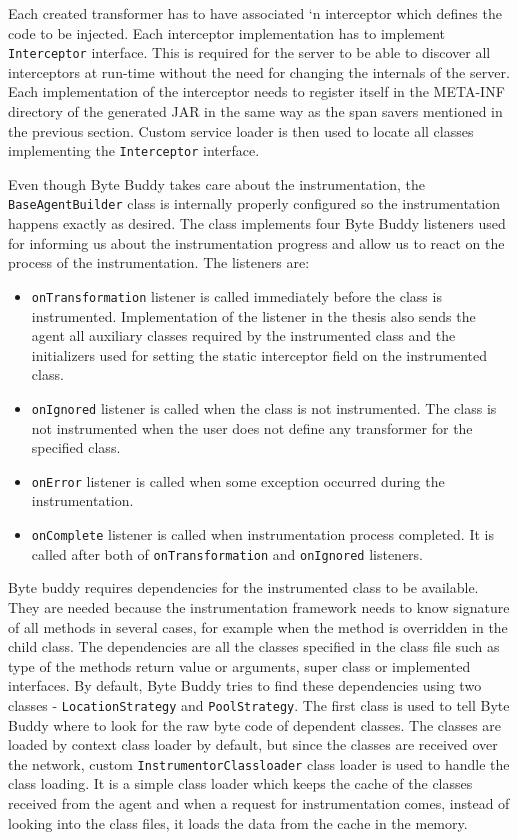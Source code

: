 Each created transformer has to have associated `n interceptor which defines the code to be injected. Each interceptor implementation has to implement \texttt{Interceptor}  interface. This is required for the server to be able to discover all interceptors at run-time without the need for changing the internals of the server. Each implementation of the interceptor needs to register itself in the META-INF directory of the generated JAR in the same way as the span savers mentioned in the previous section. Custom service loader is then used to locate all classes implementing the \texttt{Interceptor} interface.

Even though Byte Buddy takes care about the instrumentation, the \texttt{BaseAgentBuilder} class is internally properly configured so the instrumentation happens exactly as desired. The class implements four Byte Buddy listeners used for informing us about the instrumentation progress and allow us to react on the process of the instrumentation. The listeners are:
\begin{itemize}
	\item \texttt{onTransformation} listener is called immediately before the class is instrumented.  Implementation of the listener in the thesis also sends the agent all auxiliary classes required by the instrumented class and the initializers used for setting the static interceptor field on the instrumented class.
	\item \texttt{onIgnored} listener is called when the class is not instrumented. The class is not instrumented when the user does not define any transformer for the specified class.
	\item \texttt{onError} listener is called when some exception occurred during the instrumentation.
	\item \texttt{onComplete} listener is called when instrumentation process completed. It is called after both of \texttt{onTransformation} and \texttt{onIgnored} listeners.
\end{itemize}

Byte buddy requires dependencies for the instrumented class to be available. They are needed because the instrumentation framework needs to know signature of all methods in several cases, for example when the method is overridden in the child class. The dependencies are all the classes specified in the class file such as type of the methods return value or arguments, super class or implemented interfaces. 
By default, Byte Buddy tries to find these dependencies using two classes - \texttt{LocationStrategy} and \texttt{PoolStrategy}. The first class is used to tell Byte Buddy where to look for the raw byte code of dependent classes. The classes are loaded by context class loader by default, but since the classes are received over the network, custom \texttt{InstrumentorClassloader} class loader is used to handle the class loading. It is a simple class loader which keeps the cache of the classes received from the agent and when a request for instrumentation comes, instead of looking into the class files, it loads the data from the cache in the memory.

